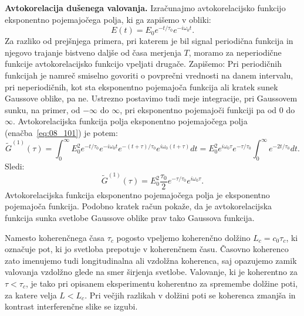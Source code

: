 \begin{example}{\bf Avtokorelacija dušenega valovanja.}
Izračunajmo avtokorelacijsko funkcijo eks\-po\-nen\-tno pojemajočega polja, ki ga zapišemo
v obliki:
\begin{equation}
E(t) = E_0 e^{-t/\tau_0}e^{-i\omega_0 t}.
\label{eq:08_101}
\end{equation}
Za razliko od prejšnjega primera, pri katerem je bil signal periodična funkcija in njegovo 
trajanje bistveno daljše od časa merjenja $T$, moramo za neperiodične funkcije avtokorelacijsko
funkcijo vpeljati drugače. Zapišemo:
Pri periodičnih funkcijah je namreč smiselno govoriti o povprečni vrednosti na danem intervalu, 
pri neperiodičnih, kot sta eksponentno pojemajoča funkcija ali kratek 
sunek Gaussove oblike, pa ne. 
Ustrezno postavimo tudi meje integracije, pri Gaussovem sunku, na primer, od $-\infty$ do $\infty$, 
pri eksponentno pojemajoči funkciji pa od $0$ do $\infty$. Avtokorelacijska 
funkcija polja eksponentno pojemajočega polja (enačba~\ref{eq:08_101}) je potem:
\begin{equation}
\tilde{G}^{(1)}(\tau)= \int_{0}^{\infty}E_0^2 e^{-t/\tau_0}e^{-i\omega_0 t}
e^{-(t+\tau)/\tau_0}e^{i\omega_0 (t+\tau)} dt = E_0^2 e^{i\omega_0 \tau}e^{-\tau/\tau_0} 
\int_{0}^{\infty} e^{-2t/\tau_0}dt.
\label{eq:08_103}
\end{equation}
Sledi:
\begin{equation}
\tilde{G}^{(1)}(\tau)= E_0^2 \frac{\tau_0}{2}e^{-\tau/\tau_0}e^{i\omega_0 \tau}.
\label{eq:08_104}
\end{equation}
Avtokorelacijska funkcija eksponentno pojemajočega polja je eksponentno pojemajoča funkcija.
Podobno kratek račun pokaže, da je avtokorelacijska funkcija sunka svetlobe Gaussove oblike 
prav tako Gaussova funkcija. 
\end{example}

Namesto koherenčnega časa $\tau_c$ pogosto vpeljemo koherenčno dolžino
$L_c = c_0 \tau_c$, ki označuje pot, ki jo svetloba prepotuje 
v koherenčnem času. Časovno koherenco zato imenujemo tudi
longitudinalna ali vzdolžna koherenca, saj opazujemo zamik valovanja
vzdolžno glede na smer širjenja svetlobe. Valovanje, ki je 
koherentno za $\tau < \tau_c$, je tako pri opisanem eksperimentu 
koherentno za spremembe dolžine poti, za katere velja $L < L_c$. Pri 
večjih razlikah v dolžini poti se koherenca zmanjša in kontrast
interferenčne slike se izgubi. 

